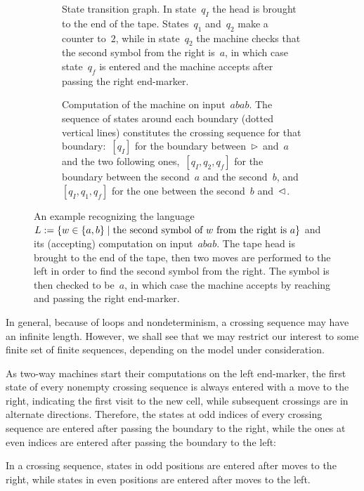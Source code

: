 \begin{figure}
	\centering
	\begin{subfigure}[b]{0.49\textwidth}
		\centering
		
		\caption{State transition graph.
			In state~$q_I$ the head is brought to the end of the tape. States~$q_1$ and~$q_2$ make a counter to~$2$, while in state~$q_2$ the machine checks that the second symbol from the right is~$a$, in which case state~$q_f$ is entered and the machine accepts after passing the right end-marker.\newline}
		\label{sfig:example-crosseq-1}
	\end{subfigure}
	\hfill
	\begin{subfigure}[b]{0.49\textwidth}
		\centering
		
		\caption{Computation of the machine on input~$abab$.
			The sequence of states around each boundary (dotted vertical lines) constitutes the crossing sequence for that boundary:~$[q_I]$ for the boundary between~$\rhd$ and~$a$ and the two following ones,~$[q_I,q_2,q_f]$ for the boundary between the second~$a$ and the second~$b$, and~$[q_I,q_1,q_f]$ for the one between the second~$b$ and~$\lhd$.}
		\label{sfig:example-crosseq-2}
	\end{subfigure}

	\caption[Example \TDFA and the crossing sequences generated by its computation on a given input.]{An example \TDFA recognizing the language~$L:=\{w\in\{a,b\}\mid \text{the second symbol of $w$ from the right is $a$} \}$ and its (accepting) computation on input~$abab$.
		The tape head is brought to the end of the tape, then two moves are performed to the left in order to find the second symbol from the right. The symbol is then checked to be~$a$, in which case the machine accepts by reaching and passing the right end-marker.}
	\label{fig:example-crosseq}
\end{figure}

In general, because of loops and nondeterminism, a crossing sequence may have an infinite length.
However, we shall see that we may restrict our interest to some finite set of finite sequences, depending on the model under consideration.

As two-way machines start their computations on the left end-marker, the first state of every nonempty crossing sequence is always entered with a move to the right, indicating the first visit to the new cell, while subsequent crossings are in alternate directions.
Therefore, the states at odd indices of every crossing sequence are entered after passing the boundary to the right, while the ones at even indices are entered after passing the boundary to the left:
\begin{fact}\label{fact:crossing-parity}
	In a crossing sequence, states in odd positions are entered after moves to the right, while states in even positions are entered after moves to the left.
\end{fact}

